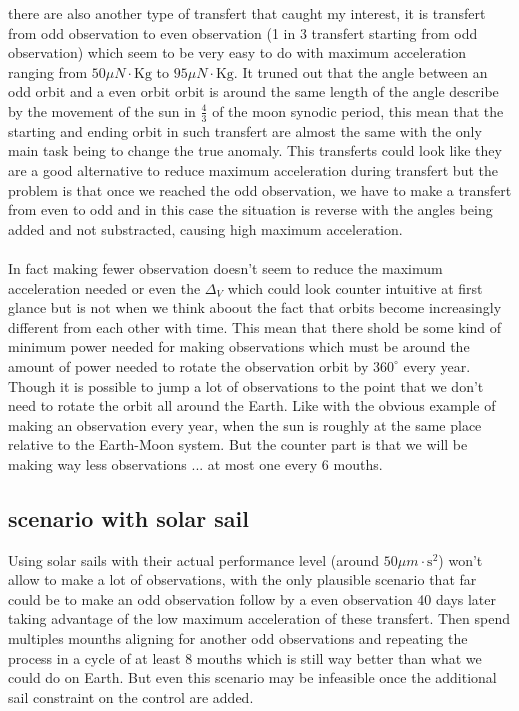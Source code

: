 \documentclass{article} %
\begin{document}
{			there are also another type of transfert that caught my interest, it is transfert from odd observation to even observation (1 in 3 transfert starting from odd observation) which seem to be very easy to do with maximum acceleration ranging from  $50 \mu{N}\cdot\text{Kg}$ to $95 \mu{N}\cdot\text{Kg}$. It truned out that the angle between an odd orbit and a even orbit orbit is around the same length of the angle describe by the movement of the sun in $\frac{4}{3}$ of the moon synodic period, this mean that the starting and ending orbit in such transfert are almost the same with the only main task being to change the true anomaly. This transferts could look like they are a good alternative to reduce maximum acceleration during transfert but the problem is that once we reached the odd observation, we have to make a transfert from even to odd and in this case the situation is reverse with the angles being added and not substracted, causing high maximum acceleration.
			\\ \\
			In fact making fewer observation doesn't seem to reduce the maximum acceleration needed or even the $\Delta_{V}$ which could look counter intuitive at first glance but is not when we think aboout the fact that orbits become increasingly different from each other with time. This mean that there shold be some kind of minimum power needed for making observations which must be around the amount of power needed to rotate the observation orbit by $360^\circ$ every year. Though it is possible to jump a lot of observations to the point that we don't need to rotate the orbit all around the Earth. Like with the obvious example of making an observation every year, when the sun is roughly at the same place relative to the Earth-Moon system. But the counter part is that we will be making way less observations ... at most one every 6 mouths. 
			\subsection{scenario with solar sail}
			
			Using solar sails with their actual performance level (around $50\mu{m}\cdot\text{s}^2$) won't allow to make a lot of observations, with the only plausible scenario that far could be to make an odd observation follow by a even observation 40 days later taking advantage of the low maximum acceleration of these transfert. Then spend multiples mounths aligning for another odd observations and repeating the process in a cycle of at least 8 mouths which is still way better than what we could do on Earth. But even this scenario may be infeasible once the additional sail constraint on the control are added.
			
}
\end{document}

